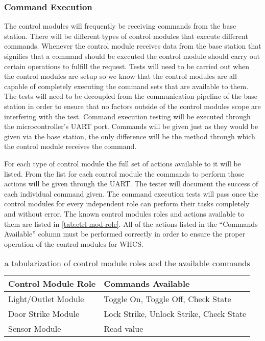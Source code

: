 \subsubsection{Command Execution}

The control modules will frequently be receiving commands from the base
station. There will be different types of control modules that execute
different commands. Whenever the control module receives data from the base
station that signifies that a command should be executed the control module
should carry out certain operations to fulfill the request. Tests will need to
be carried out when the control modules are setup so we know that the control
modules are all capable of completely executing the command sets that are
available to them. The tests will need to be decoupled from the communication
pipeline of the base station in order to ensure that no factors outside of the
control modules scope are interfering with the test. Command execution testing
will be executed through the microcontroller{}'s UART port. Commands will be
given just as they would be given via the base station, the only difference
will be the method through which the control module receives the command.

For each type of control module the full set of actions available to it will be
listed. From the list for each control module the commands to perform those
actions will be given through the UART. The tester will document the success of
each individual command given. The command execution tests will pass once the
control modules for every independent role can perform their tasks completely
and without error. The known control modules roles and actions available to
them are listed in \autoref{tab:ctrl-mod-role}. All of the actions listed in the
{}``Commands Available{}'' column must be performed correctly in order to
ensure the proper operation of the control modules for WHCS.

\begin{table}[H]
\centering
\begin{tabular}{|l|l|}
\hline
{\color{black} Control Module Role} &
{\color{black} Commands Available}\\\hline
{\color{black} Light/Outlet Module} &
{\color{black} Toggle On},
{\color{black} Toggle Off},
{\color{black} Check State}
\\\hline
{\color{black} Door Strike Module} &
{\color{black} Lock Strike},
{\color{black} Unlock Strike},
{\color{black} Check State}
\\\hline
{\color{black} Sensor Module} &
{\color{black} Read value}
\\\hline
\end{tabular}
\caption{a tabularization of control module roles and the available commands}
\label{tab:ctrl-mod-role}
\end{table}

